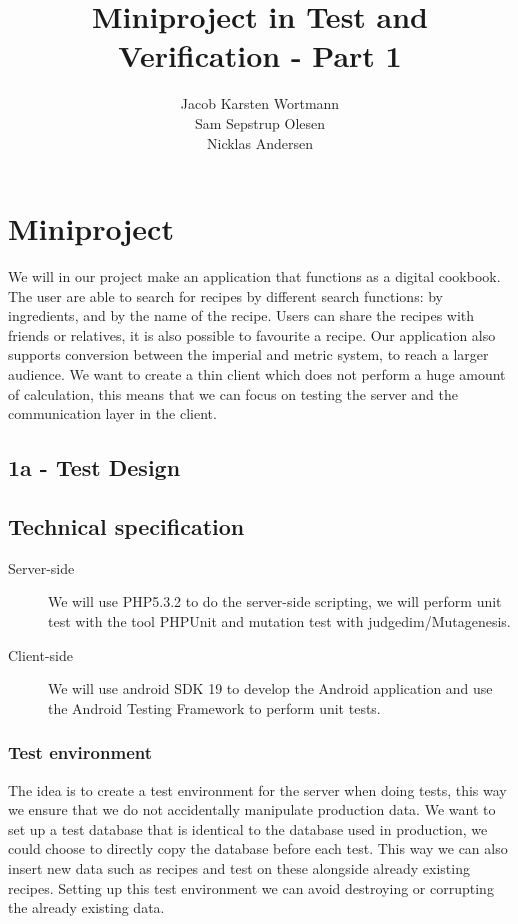 \documentclass[a4paper,12pt]{memoir}
\title{Miniproject in Test and Verification - Part 1}
\author{Jacob Karsten Wortmann\\Sam Sepstrup Olesen\\Nicklas Andersen}
\begin{document}
\maketitle
\chapter*{Miniproject}
We will in our project make an application that functions as a digital cookbook. The user are able to search for recipes by different search functions: by ingredients, and by the name of the recipe. Users can share the recipes with friends or relatives, it is also possible to favourite a recipe. Our  application also supports conversion between the imperial and metric system, to reach a larger audience. 
We want to create a thin client which does not perform a huge amount of calculation, this means that we can focus on testing the server and the communication layer in the client.

\section*{1a - Test Design}
\section*{Technical specification}
\begin{description}
    \item[Server-side]
        We will use PHP5.3.2 to do the server-side scripting,
        we will perform unit test with the tool PHPUnit and mutation test with judgedim/Mutagenesis.
    \item[Client-side]
        We will use android SDK 19 to develop the Android application and use the Android Testing Framework to perform unit tests.
\end{description}

\subsection{Test environment}
The idea is to create a test environment for the server when doing tests, this way we ensure that we do not accidentally manipulate production data. We want to set up a test database that is identical to the database used in production, we could choose to directly copy the database before each test. This way we can also insert new data such as recipes and test on these alongside already existing recipes. Setting up this test environment we can avoid destroying or corrupting the already existing data.
\end{document}
